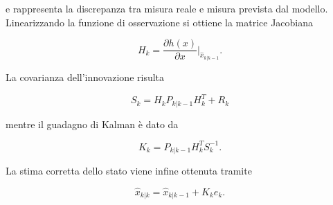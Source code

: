 \documentclass[12pt,a4paper]{article}
\begin{document}
e rappresenta la discrepanza tra misura reale e misura prevista dal modello.
Linearizzando la funzione di osservazione si ottiene la matrice Jacobiana

\begin{equation}
H_k = \frac{\partial h(x)}{\partial x} \Bigg|_{\hat{x}_{k|k-1}}.
\end{equation}

La covarianza dell'innovazione risulta

\begin{equation}
S_k = H_k P_{k|k-1} H_k^T + R_k
\end{equation}

mentre il guadagno di Kalman è dato da

\begin{equation}
K_k = P_{k|k-1} H_k^T S_k^{-1}.
\end{equation}

La stima corretta dello stato viene infine ottenuta tramite

\begin{equation}
\hat{x}_{k|k} = \hat{x}_{k|k-1} + K_k e_k.
\end{equation}
\end{document}
